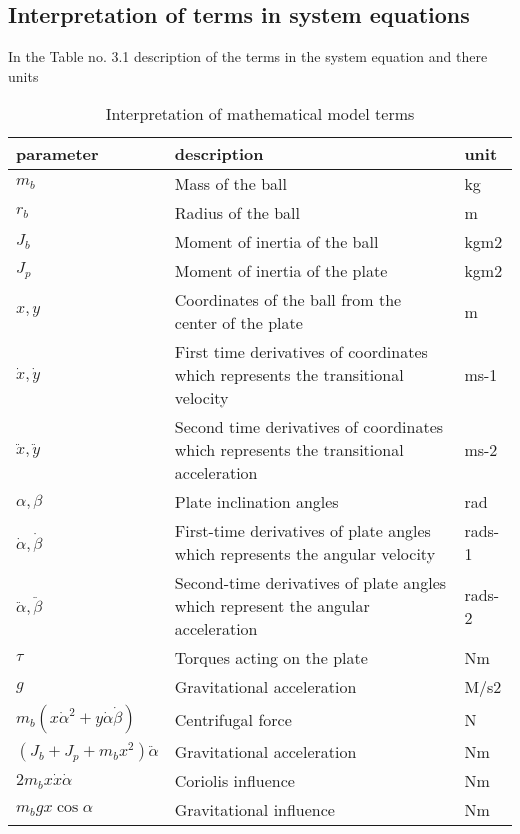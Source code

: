 \subsection{Interpretation of terms in system equations}
In the Table no. 3.1 description of the terms in the system equation and there units
\begin{table}[h]
  \centering
  \caption{Interpretation of mathematical model terms}
  \begin{tabular}{ | m{8em} | m{20em}| m{1cm} | } 
  \hline
  parameter & description & unit \\ 
  \hline  \hline
   $m_b$& Mass of the ball & kg \\ 
  \hline
  $r_b$ & Radius of the ball & m \\ 
  \hline
  $J_b$ & Moment of inertia of the ball & kgm2 \\   
  \hline
  $J_p$ & Moment of inertia of the plate & kgm2 \\   
  \hline
  $x,y$ & Coordinates of the ball from the center of the plate & m \\ 
  \hline
  $\dot{x},\dot{y}$ & First time derivatives of coordinates which represents the transitional velocity  & ms-1\\   
  \hline
  $\ddot{x},\ddot{y}$ & Second time derivatives of coordinates which represents the transitional acceleration & ms-2\\   
  \hline
  $\alpha , \beta$ & Plate inclination angles & rad \\   
  \hline 
  $\dot{\alpha},\dot{\beta}$ & First-time derivatives of plate angles which represents the angular velocity & rads-1 \\   
  \hline  
  $\ddot{\alpha},\ddot{\beta}$ & Second-time derivatives of plate angles which represent the angular acceleration & rads-2 \\   
  \hline  
  $\tau$ & Torques acting on the plate & Nm \\   
  \hline
  $g$ & Gravitational acceleration  & M/s2 \\  
  \hline
  $ m_b ( x\dot{\alpha}^2+y\dot{\alpha}\dot{\beta})$ & Centrifugal force  & N \\  
  \hline
  $(J_b+J_p+m_bx^2)\ddot{\alpha} $ & Gravitational acceleration  & Nm \\  
  \hline
  $ 2m_bx\dot{x}\dot{\alpha}$ & Coriolis influence   & Nm \\  
  \hline
  $m_bgx\cos{\alpha}$ & Gravitational influence  & Nm \\  
  \hline
  \end{tabular}

\end{table}

